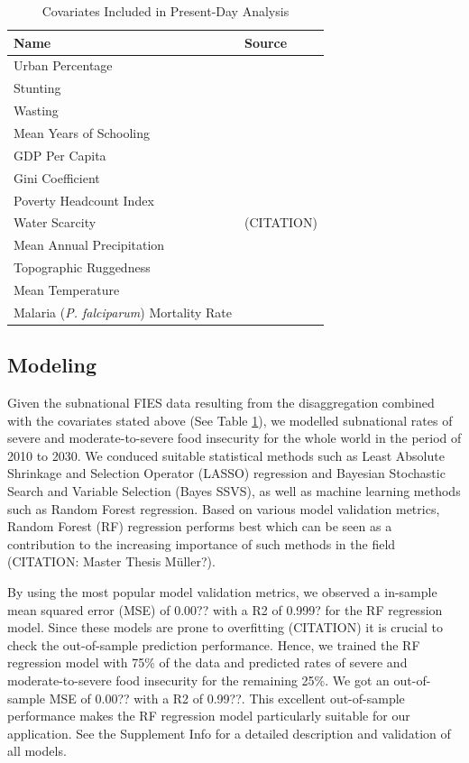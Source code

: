 \documentclass{article}
\begin{document}
\begin{table}[H]
	\begin{tabular}{ll}
		\toprule
		Name & Source \\
		\midrule
		Urban Percentage & \citep{Jones2016} \\
		Stunting & \citep{Local2020} \\
		Wasting & \citep{Local2020} \\
		Mean Years of Schooling & \citep{Smits2019, KC2017} \\
		GDP Per Capita & \citep{Smits2019, Dellink2017} \\
		Gini Coefficient & \citep{Rao2019a} \\
    Poverty Headcount Index & \citep{Cuaresma2018} \\
		Water Scarcity & (CITATION) \\
		Mean Annual Precipitation &  \cite{abatzoglou2018terraclimate, warszawski2014inter} \\
		Topographic Ruggedness &  \cite{USGS1996, Riley1999} \\
		Mean Temperature &  \cite{abatzoglou2018terraclimate, warszawski2014inter} \\
		Malaria (\textit{P. falciparum}) Mortality Rate &  \cite{Weiss2019} \\
		\bottomrule
	\end{tabular}
	\caption{Covariates Included in Present-Day Analysis}
	\label{tab:covars}
\end{table}


\subsection{Modeling}

Given the subnational FIES data resulting from the disaggregation combined with the covariates stated above (See Table \ref{tab:covars}), we modelled subnational rates of severe and moderate-to-severe food insecurity for the whole world in the period of 2010 to 2030. We conduced suitable statistical methods such as Least Absolute Shrinkage and Selection Operator (LASSO) regression and Bayesian Stochastic Search and Variable Selection (Bayes SSVS), as well as machine learning methods such as Random Forest regression. Based on various model validation metrics, Random Forest (RF) regression performs best which can be seen as a contribution to the increasing importance of such methods in the field (CITATION: Master Thesis M\"uller?).

By using the most popular model validation metrics, we observed a in-sample mean squared error (MSE) of 0.00?? with a R2 of 0.999? for the RF regression model. Since these models are prone to overfitting (CITATION) it is crucial to check the out-of-sample prediction performance. Hence, we trained the RF regression model with 75\% of the data and predicted rates of severe and moderate-to-severe food insecurity for the remaining 25\%. We got an out-of-sample MSE of 0.00?? with a R2 of 0.99??. This excellent out-of-sample performance makes the RF regression model particularly suitable for our application. See the Supplement Info for a detailed description and validation of all models.
\end{document}
